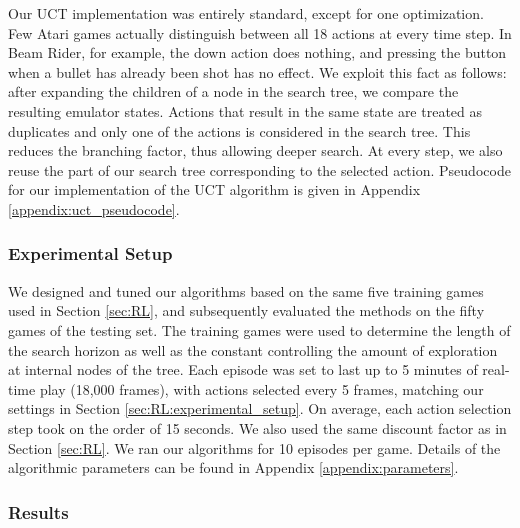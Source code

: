 \documentclass[twoside,11pt]{article}
\newcommand{\gamename}[1]{{\sc #1}}
\begin{document}
Our UCT implementation was entirely standard, except for one optimization.
Few Atari games actually distinguish between all 18 actions at every time step. 
In \gamename{Beam Rider}, for example, the down action does nothing, and pressing the button when a bullet has already been shot has no effect. We exploit this fact as follows: after expanding the children of a node in the search tree, we compare the resulting emulator states. Actions that result in the same state are treated as duplicates and only one of the actions is considered in the search tree. This reduces the branching factor, thus allowing deeper search. At every step, we also reuse the part of our search tree corresponding to the selected action. Pseudocode for our implementation of the UCT algorithm is given in Appendix \ref{appendix:uct_pseudocode}.

\subsubsection{Experimental Setup}
\label{sec:exp}

We designed and tuned our algorithms based on the same five training games used in Section \ref{sec:RL}, and subsequently evaluated the methods on the fifty games of the testing set. 
The training games were used to determine the length of the search horizon as well as the constant controlling the amount of exploration at internal nodes of the tree. 
Each episode was set to last up to 5 minutes of real-time play (18,000 frames), with actions selected every 5 frames, matching our settings in Section \ref{sec:RL:experimental_setup}. On average, each action selection step took on the order of 15 seconds. 
We also used the same discount factor as in Section \ref{sec:RL}.
We ran our algorithms for 10 episodes per game.  Details of the algorithmic parameters can be found in Appendix \ref{appendix:parameters}.

\subsubsection{Results}\label{sec:planning:results}
\end{document}
